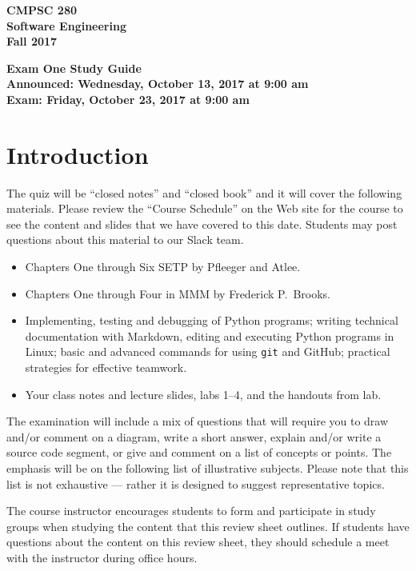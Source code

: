 \documentclass[11pt]{article}
\newcommand{\assignmentduedate}{October 23}
\newcommand{\assignmentassignedate}{October 13}
\newcommand{\assignmentnumber}{One}
\newcommand{\labyear}{2017}
\newcommand{\assignedday}{Wednesday}
\newcommand{\dueday}{Friday}
\newcommand{\labtime}{9:00 am}
\newcommand{\assigneddate}{Announced: \assignedday, \assignmentassignedate, \labyear{} at \labtime{}}
\newcommand{\duedate}{Exam: \dueday, \assignmentduedate, \labyear{} at \labtime{}}
\newcommand{\guidetitle}[1]
{
  \begin{center}
    \begin{center}
      \bf
      CMPSC 280\\Software Engineering\\
      Fall 2017\\
      \medskip
    \end{center}
    \bf
    #1
  \end{center}
}
\begin{document}
\thispagestyle{empty}

\guidetitle{Exam \assignmentnumber{} Study Guide \\ \assigneddate{} \\ \duedate{}}

\section*{Introduction}

\noindent
The quiz will be ``closed notes'' and ``closed book'' and it will cover the
following materials. Please review the ``Course Schedule'' on the Web site for
the course to see the content and slides that we have covered to this date.
Students may post questions about this material to our Slack team.

\begin{itemize}

  \itemsep 0in

  \item Chapters One through Six SETP by Pfleeger and Atlee.

  \item Chapters One through Four in MMM by Frederick P.\ Brooks.

  \item Implementing, testing and debugging of Python programs; writing
    technical documentation with Markdown, editing and executing Python programs
    in Linux; basic and advanced commands for using {\tt git} and GitHub;
    practical strategies for effective teamwork.

  \item Your class notes and lecture slides, labs 1--4, and the handouts from
    lab.

\end{itemize}

\noindent The examination will include a mix of questions that will require you
to draw and/or comment on a diagram, write a short answer, explain and/or write
a source code segment, or give and comment on a list of concepts or points. The
emphasis will be on the following list of illustrative subjects. Please note
that this list is not exhaustive --- rather it is designed to suggest
representative topics.

The course instructor encourages students to form and participate in study
groups when studying the content that this review sheet outlines. If students
have questions about the content on this review sheet, they should schedule a
meet with the instructor during office hours.
\end{document}
